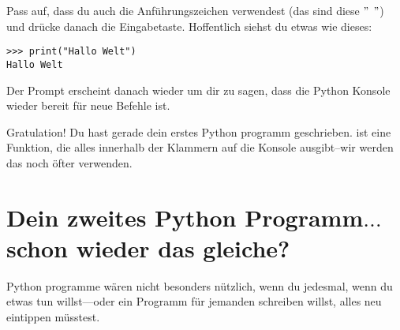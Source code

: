 Pass auf, dass du auch die Anführungszeichen verwendest (das sind diese $"$ $"$) und drücke danach die Eingabetaste. Hoffentlich siehst du etwas wie dieses:

\begin{listing}
\begin{verbatim}
>>> print("Hallo Welt")
Hallo Welt
\end{verbatim}
\end{listing}

Der Prompt erscheint danach wieder um dir zu sagen, dass die Python Konsole wieder bereit für neue Befehle ist.

\noindent
Gratulation! Du hast gerade dein erstes Python programm geschrieben.  ist eine Funktion, die alles innerhalb der Klammern auf die Konsole ausgibt--wir werden das noch öfter verwenden.

\section{Dein zweites Python Programm$\ldots$schon wieder das gleiche?}

Python programme wären nicht besonders nützlich, wenn du jedesmal, wenn du etwas tun willst---oder ein Programm für jemanden schreiben willst, alles neu eintippen müsstest.


